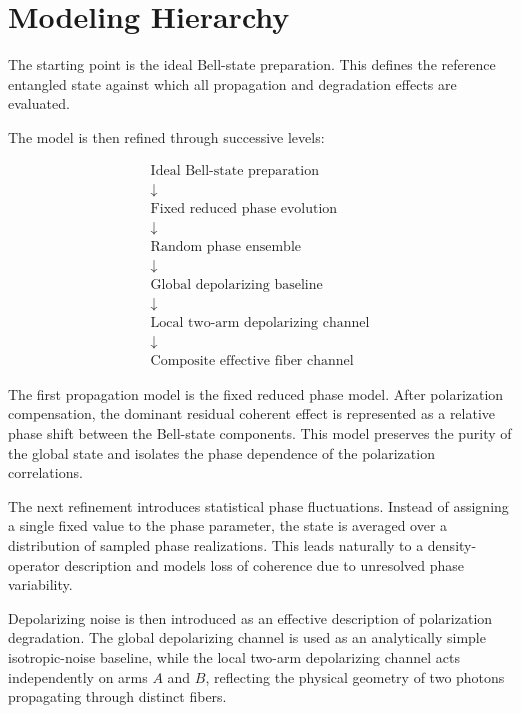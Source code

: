 \section{Modeling Hierarchy}

The starting point is the ideal Bell-state preparation. This defines the reference entangled state against which all propagation and degradation effects are evaluated.

\medskip

The model is then refined through successive levels:

\[
\begin{array}{c}
\text{Ideal Bell-state preparation} \\
\downarrow \\
\text{Fixed reduced phase evolution} \\
\downarrow \\
\text{Random phase ensemble} \\
\downarrow \\
\text{Global depolarizing baseline} \\
\downarrow \\
\text{Local two-arm depolarizing channel} \\
\downarrow \\
\text{Composite effective fiber channel}
\end{array}
\]

\medskip

The first propagation model is the fixed reduced phase model. After polarization compensation, the dominant residual coherent effect is represented as a relative phase shift between the Bell-state components. This model preserves the purity of the global state and isolates the phase dependence of the polarization correlations.

\medskip

The next refinement introduces statistical phase fluctuations. Instead of assigning a single fixed value to the phase parameter, the state is averaged over a distribution of sampled phase realizations. This leads naturally to a density-operator description and models loss of coherence due to unresolved phase variability.

\medskip

Depolarizing noise is then introduced as an effective description of polarization degradation. The global depolarizing channel is used as an analytically simple isotropic-noise baseline, while the local two-arm depolarizing channel acts independently on arms \( A \) and \( B \), reflecting the physical geometry of two photons propagating through distinct fibers.

